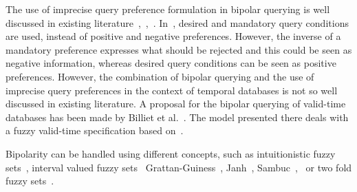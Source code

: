 The use of imprecise query preference formulation in bipolar querying is well discussed in existing literature~\cite{DeTre2009},~\cite{Dubois2008},~\cite{Lacroix87}. In~\cite{Lacroix87}, desired and mandatory query conditions are used, instead of positive and negative preferences. However, the inverse of a mandatory preference expresses what should be rejected and this could be seen as negative information, whereas desired query conditions can be seen as positive preferences. However, the combination of bipolar querying and the use of imprecise query preferences in the context of temporal databases is not so well discussed in existing literature. A proposal for the bipolar querying of valid-time databases has been made by Billiet et al.~\cite{Billiet:Pons:Matthe:DeTre:Pons:2011:BipolarFuzzy}. The model presented there deals with a fuzzy valid-time specification based on~\cite{garrido2009}.




Bipolarity can be handled using different concepts, such as intuitionistic fuzzy sets~\cite{Atanassov1986}, interval valued fuzzy sets~\cite{Zadeh75a} Grattan-Guiness~\cite{Grattan76}, Janh~\cite{Jahn75}, Sambuc~\cite{Sambuc75},~\cite{Dubois05} or two fold fuzzy sets~\cite{Dubois02}.


